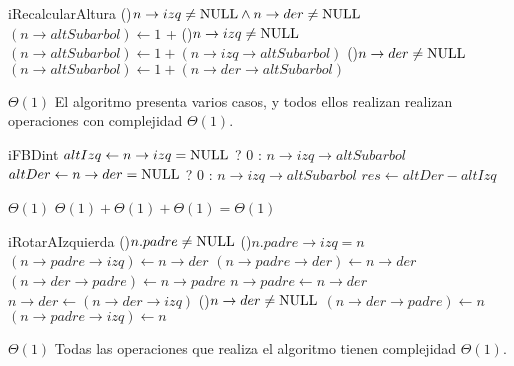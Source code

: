 \begin{Algoritmos}
  \begin{algoritmo}{iRecalcularAltura}{}{}
    \uIf(){$n \to izq \neq \textrm{NULL} \land n \to der \neq \textrm{NULL}$}{
      $(n \to altSubarbol) \gets 1$ +  
    }\uElseIf(){$n \to izq \neq \textrm{NULL}$}{
      $(n \to altSubarbol) \gets 1 + (n \to izq \to altSubarbol)$ 
    }\uElseIf(){$n \to der \neq \textrm{NULL}$}{
      $(n \to altSubarbol) \gets 1 + (n \to der \to altSubarbol)$ 
    }
  \end{algoritmo}
  {} %
  {} %
  {$\Theta(1)$} %
  {El algoritmo presenta varios casos, y todos ellos realizan realizan operaciones con complejidad $\Theta(1)$.} %

  \begin{algoritmo}{iFBD}{}{int}
     $altIzq \gets n \to izq = \textrm{NULL}$ ? 0 : $n \to izq \to altSubarbol$ 
     $altDer \gets n \to der = \textrm{NULL}$ ? 0 : $n \to izq \to altSubarbol$ 
    $res \gets altDer - altIzq$ 
  \end{algoritmo}
  {} %
  {} %
  {$\Theta(1)$} %
  {$\Theta(1) + \Theta(1) + \Theta(1) = \Theta(1)$} %

  \begin{algoritmo}{iRotarAIzquierda}{}{}
    \If(){$n.padre \neq \textrm{NULL}$}{
      \eIf(){$n.padre \to izq = n$}{
        $(n \to padre \to izq) \gets n \to der$ 
      }{
        $(n \to padre \to der) \gets n \to der$ 
      }
    }
    $(n \to der \to padre) \gets n \to padre$  
    $n \to padre \gets n \to der$ 
    $n \to der \gets (n \to der \to izq)$ 
    \If(){$n \to der \neq \textrm{NULL}$}{
      $(n \to der \to padre) \gets n$ 
    }
    $(n \to padre \to izq) \gets n$ 
     
     
  \end{algoritmo}
  {} %
  {} %
  {$\Theta(1)$} %
  {Todas las operaciones que realiza el algoritmo tienen complejidad $\Theta(1)$.} %


\end{Algoritmos}
